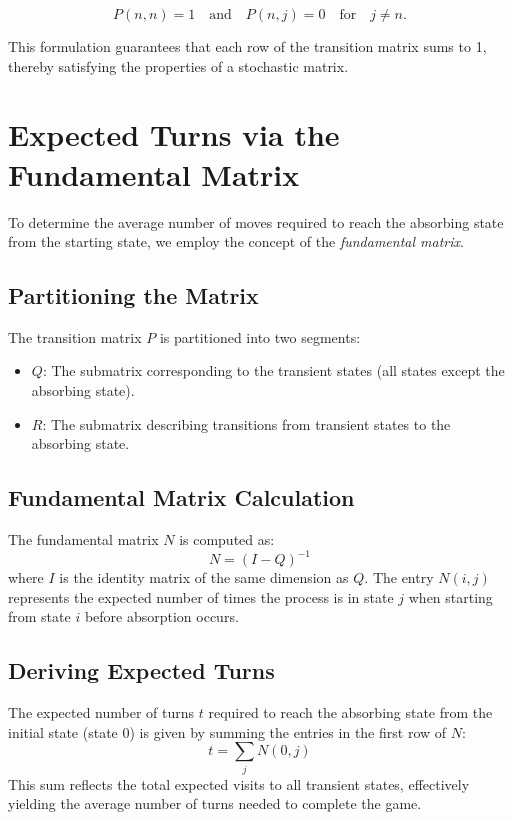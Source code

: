 \[
P(n, n) = 1 \quad \text{and} \quad P(n, j) = 0 \quad \text{for} \quad j \neq n.
\]

This formulation guarantees that each row of the transition matrix sums to 1, thereby satisfying the properties of a stochastic matrix.

\section{Expected Turns via the Fundamental Matrix}

To determine the average number of moves required to reach the absorbing state from the starting state, we employ the concept of the \textit{fundamental matrix}.

\subsection{Partitioning the Matrix}

The transition matrix $P$ is partitioned into two segments:
\begin{itemize}
	\item $Q$: The submatrix corresponding to the transient states (all states except the absorbing state).
	\item $R$: The submatrix describing transitions from transient states to the absorbing state.
\end{itemize}

\subsection{Fundamental Matrix Calculation}

The fundamental matrix $N$ is computed as:
\[
N = (I - Q)^{-1}
\]
where $I$ is the identity matrix of the same dimension as $Q$. The entry $N(i, j)$ represents the expected number of times the process is in state $j$ when starting from state $i$ before absorption occurs.

\subsection{Deriving Expected Turns}

The expected number of turns $t$ required to reach the absorbing state from the initial state (state 0) is given by summing the entries in the first row of $N$:
\[
t = \sum_{j} N(0, j)
\]
This sum reflects the total expected visits to all transient states, effectively yielding the average number of turns needed to complete the game.

